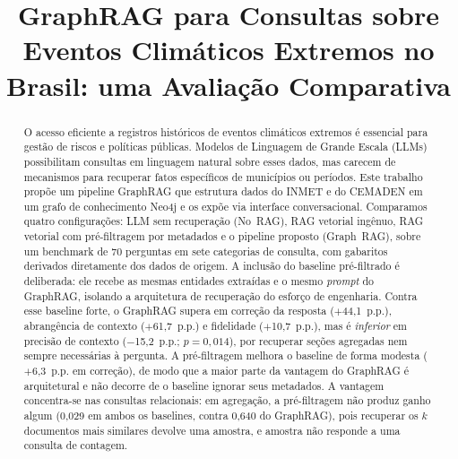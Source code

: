 \documentclass[conference]{IEEEtran}
\begin{document}
\title{GraphRAG para Consultas sobre Eventos Climáticos Extremos
no Brasil: uma Avaliação Comparativa}

\author{
}

\maketitle

\begin{abstract}
O acesso eficiente a registros históricos de eventos climáticos
extremos é essencial para gestão de riscos e políticas públicas.
Modelos de Linguagem de Grande Escala (LLMs) possibilitam consultas
em linguagem natural sobre esses dados, mas carecem de mecanismos
para recuperar fatos específicos de municípios ou períodos.
Este trabalho propõe um pipeline GraphRAG que estrutura dados do
INMET e do CEMADEN em um grafo de conhecimento Neo4j e os expõe
via interface conversacional.
Comparamos quatro configurações: LLM sem recuperação (No~RAG),
RAG vetorial ingênuo, RAG vetorial com pré-filtragem por metadados e o
pipeline proposto (Graph~RAG), sobre um benchmark de 70 perguntas em sete
categorias de consulta, com gabaritos derivados diretamente dos dados de origem.
A inclusão do baseline pré-filtrado é deliberada: ele recebe as mesmas entidades
extraídas e o mesmo \textit{prompt} do GraphRAG, isolando a arquitetura de
recuperação do esforço de engenharia.
Contra esse baseline forte, o GraphRAG supera em correção da resposta
($+$44,1~p.p.), abrangência de contexto
($+$61,7~p.p.) e fidelidade
($+$10,7~p.p.), mas é \emph{inferior} em precisão de
contexto ($-$15,2~p.p.; $p=0{,}014$), por
recuperar seções agregadas nem sempre necessárias à pergunta.
A pré-filtragem melhora o baseline de forma modesta
($+$6,3~p.p. em correção), de modo que a maior parte da vantagem do GraphRAG é
arquitetural e não decorre de o baseline ignorar seus metadados.
A vantagem concentra-se nas consultas relacionais: em agregação, a
pré-filtragem não produz ganho algum (0,029 em ambos os baselines, contra
0,640 do GraphRAG), pois recuperar os $k$ documentos mais
similares devolve uma amostra, e amostra não responde a uma consulta de contagem.
\end{abstract}
\end{document}
